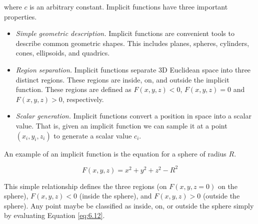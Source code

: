 where $c$ is an arbitrary constant. Implicit functions have three
important properties.

\begin{itemize}

\item \emph{Simple geometric description.} Implicit functions are convenient tools to describe common geometric shapes. This includes planes, spheres, cylinders, cones, ellipsoids, and quadrics.

\item \emph{Region separation.} Implicit functions separate 3D Euclidean space into three distinct regions. These regions are inside, on, and outside the implicit function. These regions are defined as $F(x,y,z) < 0$, $F(x,y,z) = 0$ and $F(x,y,z) > 0$, respectively.

\item \emph{Scalar generation.} Implicit functions convert a position in space into a scalar value. That is, given an implicit function we can sample it at a point $(x_i,y_i,z_i)$ to generate a scalar value $c_i$.

\end{itemize}

An example of an implicit function is the equation for a sphere of radius $R$.

\begin{equation}\label{eq:6.12}
F(x,y,z) = x^2 + y^2 + z^2 - R^2
\end{equation}

This simple relationship defines the three regions (on $F(x,y,z = 0)$ on the sphere), $F(x,y,z) < 0$ (inside the sphere), and $F(x,y,z) > 0$ (outside the sphere). Any point maybe be classified as inside, on, or outside the sphere simply by evaluating Equation \ref{eq:6.12}.

